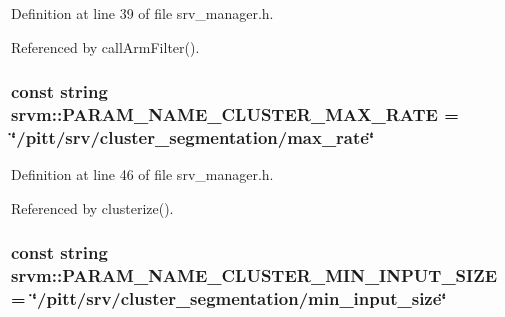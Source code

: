 Definition at line 39 of file srv\-\_\-manager.\-h.



Referenced by call\-Arm\-Filter().

\hypertarget{namespacesrvm_ac57a3b8f3addc024383db76f1d2c55da}{
\subsubsection[{P\-A\-R\-A\-M\-\_\-\-N\-A\-M\-E\-\_\-\-C\-L\-U\-S\-T\-E\-R\-\_\-\-M\-A\-X\-\_\-\-R\-A\-T\-E}]{\setlength{\rightskip}{0pt plus 5cm}const string srvm\-::\-P\-A\-R\-A\-M\-\_\-\-N\-A\-M\-E\-\_\-\-C\-L\-U\-S\-T\-E\-R\-\_\-\-M\-A\-X\-\_\-\-R\-A\-T\-E = \char`\"{}/pitt/srv/cluster\-\_\-segmentation/max\-\_\-rate\char`\"{}}}\label{namespacesrvm_ac57a3b8f3addc024383db76f1d2c55da}


Definition at line 46 of file srv\-\_\-manager.\-h.



Referenced by clusterize().

\hypertarget{namespacesrvm_a3f21a743638bc9a2a5fbfbc5711e4095}{
\subsubsection[{P\-A\-R\-A\-M\-\_\-\-N\-A\-M\-E\-\_\-\-C\-L\-U\-S\-T\-E\-R\-\_\-\-M\-I\-N\-\_\-\-I\-N\-P\-U\-T\-\_\-\-S\-I\-Z\-E}]{\setlength{\rightskip}{0pt plus 5cm}const string srvm\-::\-P\-A\-R\-A\-M\-\_\-\-N\-A\-M\-E\-\_\-\-C\-L\-U\-S\-T\-E\-R\-\_\-\-M\-I\-N\-\_\-\-I\-N\-P\-U\-T\-\_\-\-S\-I\-Z\-E = \char`\"{}/pitt/srv/cluster\-\_\-segmentation/min\-\_\-input\-\_\-size\char`\"{}}}\label{namespacesrvm_a3f21a743638bc9a2a5fbfbc5711e4095}


